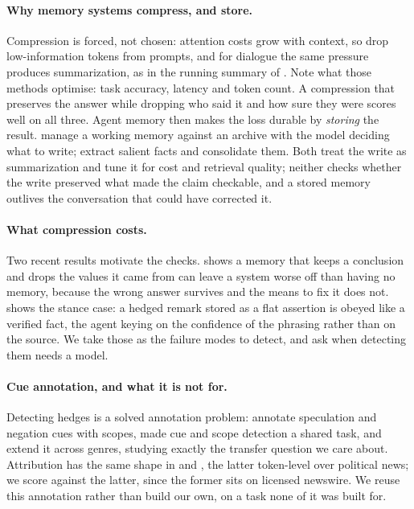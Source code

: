 \documentclass[11pt]{article}
\begin{document}
\paragraph{Why memory systems compress, and store.}
Compression is forced, not chosen: attention costs grow with context, so
\citet{jiang2023llmlingua} drop low-information tokens from prompts, and for dialogue
the same pressure produces summarization, as in the running summary of
\citet{wang2025recursive}. Note what those methods optimise: task accuracy, latency and
token count. A compression that preserves the answer while dropping who said it and how
sure they were scores well on all three. Agent memory then makes the loss durable by
\emph{storing} the result. \citet{packer2023memgpt} manage a working memory against an
archive with the model deciding what to write; \citet{chhikara2025mem0} extract salient
facts and consolidate them. Both treat the write as summarization and tune it for cost
and retrieval quality; neither checks whether the write preserved what made the claim
checkable, and a stored memory outlives the conversation that could have corrected it.

\paragraph{What compression costs.}
Two recent results motivate the checks. \citet{kwon2026reclaim} shows a memory that
keeps a conclusion and drops the values it came from can leave a system worse off than
having no memory, because the wrong answer survives and the means to fix it does not.
\citet{kwon2026mc} shows the stance case: a hedged remark stored as a flat assertion is
obeyed like a verified fact, the agent keying on the confidence of the phrasing rather
than on the source. We take those as the failure modes to detect, and ask when detecting
them needs a model.

\paragraph{Cue annotation, and what it is not for.}
Detecting hedges is a solved annotation problem: \citet{vincze2008bioscope} annotate
speculation and negation cues with scopes, \citet{farkas2010conll} made cue and scope
detection a shared task, and \citet{szarvas2012cross} extend it across genres, studying
exactly the transfer question we care about. Attribution has the same shape in
\citet{pareti2016parc} and \citet{newell2018polnear}, the latter token-level over
political news; we score against the latter, since the former sits on licensed newswire.
We reuse this annotation rather than build our own, on a task none of it was built for.
\end{document}

